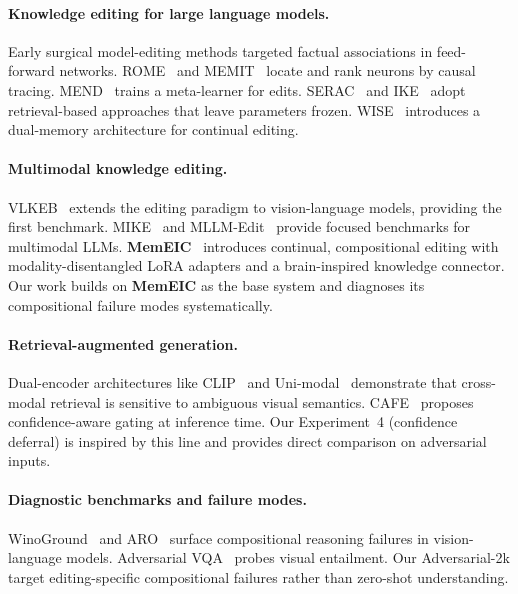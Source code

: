 \documentclass[11pt]{article}
\newcommand{\memeic}{\textbf{MemEIC}}
\begin{document}
\paragraph{Knowledge editing for large language models.}
Early surgical model-editing methods targeted factual associations in
feed-forward networks. ROME~\citep{meng2022rome} and MEMIT~\citep{meng2023memit}
locate and rank neurons by causal tracing. MEND~\citep{mitchell2022fast} trains
a meta-learner for edits. SERAC~\citep{mitchell2022memory} and IKE~\citep{zheng2023ike}
adopt retrieval-based approaches that leave parameters frozen. WISE~\citep{wang2024wise}
introduces a dual-memory architecture for continual editing.

\paragraph{Multimodal knowledge editing.}
VLKEB~\citep{huang2024vlkeb} extends the editing paradigm to vision-language
models, providing the first benchmark. MIKE~\citep{li2024mike} and
MLLM-Edit~\citep{cheng2023multimodal} provide focused benchmarks for multimodal
LLMs. \memeic{}~\citep{memeic2025} introduces continual, compositional editing
with modality-disentangled LoRA adapters and a brain-inspired knowledge
connector. Our work builds on \memeic{} as the base system and diagnoses its
compositional failure modes systematically.

\paragraph{Retrieval-augmented generation.}
Dual-encoder architectures like CLIP~\citep{radford2021clip} and
Uni-modal~\citep{zhu2022uni} demonstrate that cross-modal retrieval is
sensitive to ambiguous visual semantics. CAFE~\citep{chen2024cafe} proposes
confidence-aware gating at inference time. Our Experiment~4 (confidence
deferral) is inspired by this line and provides direct comparison on adversarial
inputs.

\paragraph{Diagnostic benchmarks and failure modes.}
WinoGround~\citep{thrush2022winoground} and ARO~\citep{yuksekgonul2022wino}
surface compositional reasoning failures in vision-language models.
Adversarial VQA~\citep{li2019vqa} probes visual entailment. Our Adversarial-2k
target editing-specific compositional failures rather than zero-shot
understanding.
\end{document}
